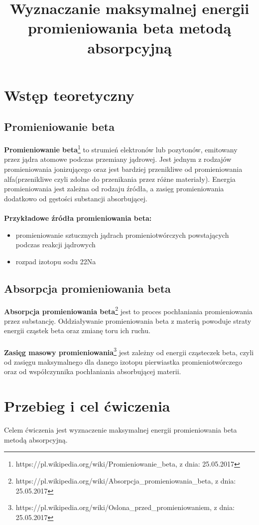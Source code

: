 \documentclass{article}
\begin{document}
\title{\huge\bfseries Wyznaczanie maksymalnej energii promieniowania
beta metodą absorpcyjną}
\date{}
\author{}
\maketitle
\section{Wstęp teoretyczny}
\subsection{Promieniowanie beta}
\textbf{Promieniowanie beta}\footnote[1]{https://pl.wikipedia.org/wiki/Promieniowanie\_beta, z dnia: 25.05.2017} to strumień elektronów lub pozytonów, emitowany przez jądra atomowe podczas przemiany jądrowej. Jest jednym z rodzajów promieniowania jonizującego oraz
jest bardziej przenikliwe od promieniowania alfa(przenikliwe czyli zdolne do przenikania przez różne materiały).
Energia promieniowania jest zależna od rodzaju źródła, a zasięg promieniowania dodatkowo od gęstości substancji absorbującej.\\\\
\textbf{Przykładowe źródła promieniowania beta:}
\begin{itemize}
\item promieniowanie sztucznych jądrach promieniotwórczych powstających podczas reakcji jądrowych
\item rozpad izotopu sodu 22Na
\end{itemize}
\subsection{Absorpcja promieniowania beta}
\textbf{Absorpcja promieniowania beta}\footnote[2]{https://pl.wikipedia.org/wiki/Absorpcja\_promieniowania\_beta, z dnia: 25.05.2017} jest to proces pochłaniania promieniowania przez substancję. Oddziaływanie promieniowania beta z materią powoduje straty energii cząstek beta oraz zmianę toru ich ruchu.\\\\
\textbf{Zasięg masowy promieniowania}\footnote[3]{https://pl.wikipedia.org/wiki/Oslona\_przed\_promieniowaniem, z dnia: 25.05.2017} jest zależny od energii cząsteczek beta, czyli od zasięgu maksymalnego dla danego izotopu pierwiastka promieniotwórczego oraz od współczynnika pochłaniania absorbującej materii.
\section{Przebieg i cel ćwiczenia}
Celem ćwiczenia jest wyznaczenie maksymalnej energii promieniowania beta metodą absorpcyjną.
\end{document}
